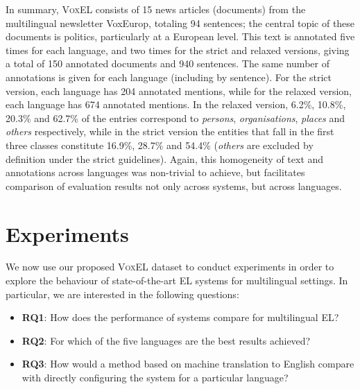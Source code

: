 \documentclass{llncs}
\begin{document}
In summary, \textsc{VoxEL} consists of 15 news articles (documents) from the multilingual newsletter VoxEurop, totaling 94 sentences; the central topic of these documents is politics, particularly at a European level. This text is annotated five times for each language, and two times for the strict and relaxed versions, giving a total of 150 annotated documents and 940 sentences. The same number of annotations is given for each language (including by sentence). For the strict version, each language has 204 annotated mentions, while for the relaxed version, each language has 674 annotated mentions. In the relaxed version, 6.2\%, 10.8\%, 20.3\% and 62.7\% of the entries correspond to \textit{persons}, \textit{organisations}, \textit{places} and \textit{others} respectively, while in the strict version the entities that fall in the first three classes constitute 16.9\%, 28.7\% and 54.4\% (\textit{others} are excluded by definition under the strict guidelines). Again, this homogeneity of text and annotations across languages was non-trivial to achieve, but facilitates comparison of evaluation results not only across systems, but across languages. %

\section{Experiments}\label{sec:exp}

We now use our proposed \textsc{VoxEL} dataset to conduct experiments in order to explore the behaviour of state-of-the-art EL systems for multilingual settings. In particular, we are interested in the following questions:

\begin{itemize}
\item \textbf{RQ1}: How does the performance of systems compare for multilingual EL?
\item \textbf{RQ2}: For which of the five languages are the best results achieved?
\item \textbf{RQ3}: How would a method based on machine translation to English compare with directly configuring the system for a particular language?
\end{itemize}
\end{document}

